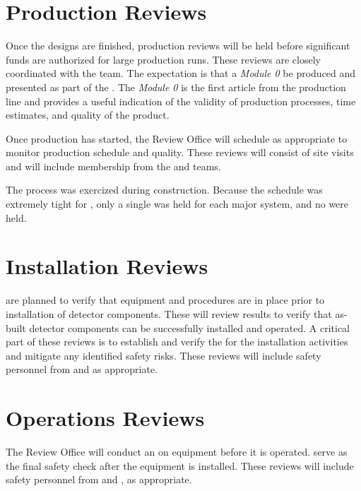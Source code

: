 \section{Production Reviews}

Once the designs are finished, production reviews will be held before
significant funds are authorized for large production runs. These
reviews are closely coordinated with the  team. The
expectation is that a \textit{Module 0} be produced and presented as
part of the . The \textit{Module 0} is the first article
from the production line and provides a useful indication of the
validity of production processes, time estimates, and quality of the
product.

Once production has started, the Review Office will schedule  as
appropriate to monitor production schedule and quality. These reviews
will consist of site visits and will include membership from the
 and  teams.

The  process was exercized during 
construction. Because the schedule was extremely tight for
, only a single  was held for each major
system, and no  were held.


\section{Installation Reviews}

 are planned to verify that equipment and procedures are in
place prior to installation of detector components. These will
review  results to verify that as-built detector
components can be successfully installed and operated. A critical part
of these reviews is to establish and verify the  for the
installation activities and mitigate any identified safety risks.  These reviews
will include safety personnel from  and  as
appropriate.


\section{Operations Reviews}

The Review Office will conduct an  on equipment before it is operated.   serve as the final safety check after the 
equipment is installed. %
These
reviews will include safety personnel from  and
, as appropriate. 

